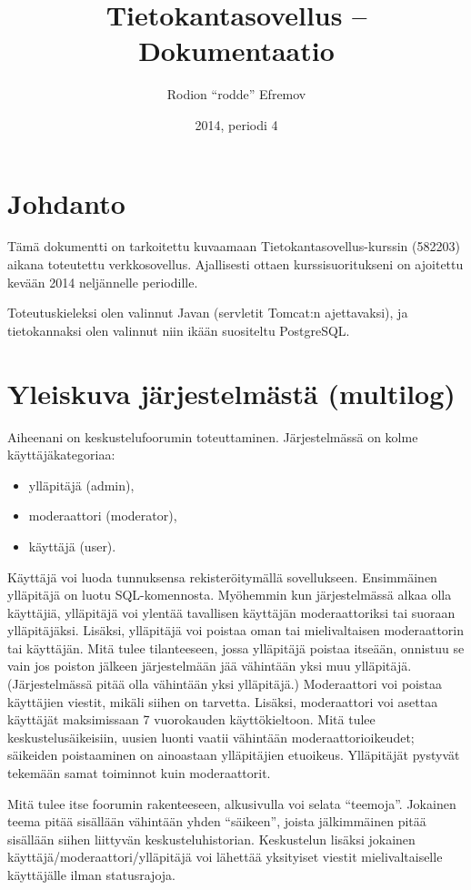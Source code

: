 \documentclass[10pt]{article}
\title{Tietokantasovellus -- Dokumentaatio}
\date{2014, periodi 4}
\author{Rodion ``rodde'' Efremov}
\begin{document}
\maketitle
\newpage
\tableofcontents
\newpage
{}

\section{Johdanto} Tämä dokumentti on tarkoitettu kuvaamaan Tietokantasovellus-kurssin (582203) aikana toteutettu verkkosovellus. Ajallisesti ottaen kurssisuoritukseni on ajoitettu kevään 2014 neljännelle periodille.

Toteutuskieleksi olen valinnut Javan (servletit Tomcat:n ajettavaksi), ja tietokannaksi olen valinnut niin ikään suositeltu PostgreSQL.

\section{Yleiskuva järjestelmästä (multilog)}
Aiheenani on keskustelufoorumin toteuttaminen. Järjestelmässä on kolme käyttäjäkategoriaa: 
\begin{itemize}
  \item ylläpitäjä (admin),
  \item moderaattori (moderator),
  \item käyttäjä (user).
\end{itemize}
Käyttäjä voi luoda tunnuksensa rekisteröitymällä sovellukseen. Ensimmäinen ylläpitäjä on luotu SQL-komennosta. Myöhemmin kun järjestelmässä alkaa olla käyttäjiä, ylläpitäjä voi ylentää tavallisen käyttäjän moderaattoriksi tai suoraan ylläpitäjäksi. Lisäksi, ylläpitäjä voi poistaa oman tai mielivaltaisen moderaattorin tai käyttäjän. Mitä tulee tilanteeseen, jossa ylläpitäjä poistaa itseään, onnistuu se vain jos poiston jälkeen järjestelmään jää vähintään yksi muu ylläpitäjä. (Järjestelmässä pitää olla vähintään yksi ylläpitäjä.) Moderaattori voi poistaa käyttäjien viestit, mikäli siihen on tarvetta. Lisäksi, moderaattori voi asettaa käyttäjät maksimissaan 7 vuorokauden käyttökieltoon. Mitä tulee keskustelusäikeisiin, uusien luonti vaatii vähintään moderaattorioikeudet; säikeiden poistaaminen on ainoastaan ylläpitäjien etuoikeus. Ylläpitäjät pystyvät tekemään samat toiminnot kuin moderaattorit.

Mitä tulee itse foorumin rakenteeseen, alkusivulla voi selata ``teemoja''. Jokainen teema pitää sisällään vähintään yhden ``säikeen'', joista jälkimmäinen pitää sisällään siihen liittyvän keskusteluhistorian. Keskustelun lisäksi jokainen käyttäjä/moderaattori/ylläpitäjä voi lähettää yksityiset viestit mielivaltaiselle käyttäjälle ilman statusrajoja.
\end{document}
